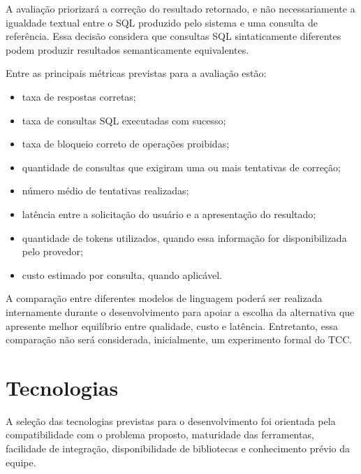 A avaliação priorizará a correção do resultado retornado, e não necessariamente a igualdade textual entre o SQL produzido pelo sistema e uma consulta de referência. Essa decisão considera que consultas SQL sintaticamente diferentes podem produzir resultados semanticamente equivalentes.

Entre as principais métricas previstas para a avaliação estão:

\begin{itemize}

    \item taxa de respostas corretas;

    \item taxa de consultas SQL executadas com sucesso;

    \item taxa de bloqueio correto de operações proibidas;

    \item quantidade de consultas que exigiram uma ou mais tentativas de correção;

    \item número médio de tentativas realizadas;

    \item latência entre a solicitação do usuário e a apresentação do resultado;

    \item quantidade de tokens utilizados, quando essa informação for disponibilizada pelo provedor;

    \item custo estimado por consulta, quando aplicável.

\end{itemize}

A comparação entre diferentes modelos de linguagem poderá ser realizada internamente durante o desenvolvimento para apoiar a escolha da alternativa que apresente melhor equilíbrio entre qualidade, custo e latência. Entretanto, essa comparação não será considerada, inicialmente, um experimento formal do TCC.


\section{Tecnologias}

A seleção das tecnologias previstas para o desenvolvimento foi orientada pela compatibilidade com o problema proposto, maturidade das ferramentas, facilidade de integração, disponibilidade de bibliotecas e conhecimento prévio da equipe.

